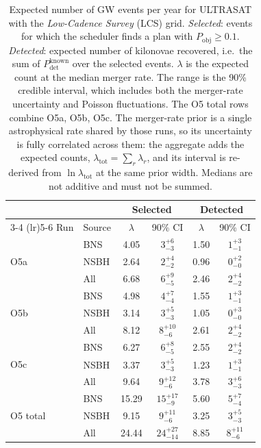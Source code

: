\begin{table}[!htb]
\centering
\renewcommand\arraystretch{1.15}
\setlength{\tabcolsep}{0.22cm}
\caption{Expected number of GW events per year for ULTRASAT with the \emph{Low-Cadence Survey} (LCS) grid. \emph{Selected}: events for which the scheduler finds a plan with $P_\mathrm{obj} \geq 0.1$. \emph{Detected}: expected number of kilonovae recovered, i.e.\ the sum of $P_\mathrm{det}^\mathrm{known}$ over the selected events. $\lambda$ is the expected count at the median merger rate. The range is the 90\% credible interval, which includes both the merger-rate uncertainty and Poisson fluctuations. The O5 total rows combine O5a, O5b, O5c. The merger-rate prior is a single astrophysical rate shared by those runs, so its uncertainty is fully correlated across them: the aggregate adds the expected counts, $\lambda_\mathrm{tot} = \sum_r \lambda_r$, and its interval is re-derived from $\ln \lambda_\mathrm{tot}$ at the same prior width. Medians are not additive and must not be summed.}
\label{tab:ultrasat-non-overlap-selected-detected-1yr}
\begin{tabular}{llcccc}
\toprule
 & & \multicolumn{2}{c}{Selected} & \multicolumn{2}{c}{Detected} \\
\cmidrule(lr){3-4} \cmidrule(lr){5-6}
Run & Source & $\lambda$ & 90\% CI & $\lambda$ & 90\% CI \\
\midrule
\multirow{3}{*}{O5a} & BNS  & 4.05 & $3^{+6}_{-3}$ & 1.50 & $1^{+3}_{-1}$ \\
                     & NSBH & 2.64 & $2^{+4}_{-2}$ & 0.96 & $0^{+2}_{-0}$ \\
                     & All  & 6.68 & $6^{+9}_{-5}$ & 2.46 & $2^{+4}_{-2}$ \\
\midrule
\multirow{3}{*}{O5b} & BNS  & 4.98 & $4^{+7}_{-4}$ & 1.55 & $1^{+3}_{-1}$ \\
                     & NSBH & 3.14 & $3^{+5}_{-3}$ & 1.05 & $0^{+3}_{-0}$ \\
                     & All  & 8.12 & $8^{+10}_{-6}$ & 2.61 & $2^{+4}_{-2}$ \\
\midrule
\multirow{3}{*}{O5c} & BNS  & 6.27 & $6^{+8}_{-5}$ & 2.55 & $2^{+4}_{-2}$ \\
                     & NSBH & 3.37 & $3^{+5}_{-3}$ & 1.23 & $1^{+3}_{-1}$ \\
                     & All  & 9.64 & $9^{+12}_{-6}$ & 3.78 & $3^{+6}_{-3}$ \\
\midrule
\multirow{3}{*}{O5 total} & BNS  & 15.29 & $15^{+17}_{-9}$ & 5.60 & $5^{+7}_{-4}$ \\
                          & NSBH & 9.15 & $9^{+11}_{-6}$ & 3.25 & $3^{+5}_{-3}$ \\
                          & All  & 24.44 & $24^{+27}_{-14}$ & 8.85 & $8^{+11}_{-6}$ \\
\bottomrule
\end{tabular}
\end{table}
